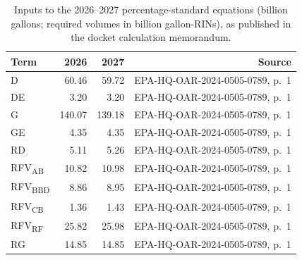 \begin{table}[htbp]
\centering
\caption{Inputs to the 2026--2027 percentage-standard equations (billion gallons; required volumes in billion gallon-RINs), as published in the docket calculation memorandum.}
\label{tab:inputs}
\footnotesize\setlength{\tabcolsep}{4pt}
\begin{tabular}{lrrr}
\toprule
Term & 2026 & 2027 & Source \\
\midrule
D & 60.46 & 59.72 & EPA-HQ-OAR-2024-0505-0789, p.~1 \\
DE & 3.20 & 3.20 & EPA-HQ-OAR-2024-0505-0789, p.~1 \\
G & 140.07 & 139.18 & EPA-HQ-OAR-2024-0505-0789, p.~1 \\
GE & 4.35 & 4.35 & EPA-HQ-OAR-2024-0505-0789, p.~1 \\
RD & 5.11 & 5.26 & EPA-HQ-OAR-2024-0505-0789, p.~1 \\
RFV\textsubscript{AB} & 10.82 & 10.98 & EPA-HQ-OAR-2024-0505-0789, p.~1 \\
RFV\textsubscript{BBD} & 8.86 & 8.95 & EPA-HQ-OAR-2024-0505-0789, p.~1 \\
RFV\textsubscript{CB} & 1.36 & 1.43 & EPA-HQ-OAR-2024-0505-0789, p.~1 \\
RFV\textsubscript{RF} & 25.82 & 25.98 & EPA-HQ-OAR-2024-0505-0789, p.~1 \\
RG & 14.85 & 14.85 & EPA-HQ-OAR-2024-0505-0789, p.~1 \\
\bottomrule
\end{tabular}
\end{table}
